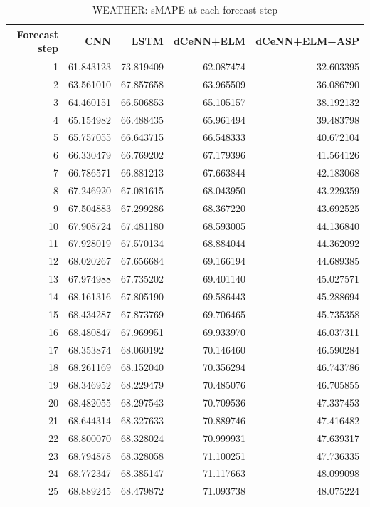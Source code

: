 \begin{table}
\caption{WEATHER: sMAPE at each forecast step}
\begin{tabular}{rrrrr}
\toprule
Forecast step & CNN & LSTM & dCeNN+ELM & dCeNN+ELM+ASP \\
\midrule
1 & 61.843123 & 73.819409 & 62.087474 & 32.603395 \\
2 & 63.561010 & 67.857658 & 63.965509 & 36.086790 \\
3 & 64.460151 & 66.506853 & 65.105157 & 38.192132 \\
4 & 65.154982 & 66.488435 & 65.961494 & 39.483798 \\
5 & 65.757055 & 66.643715 & 66.548333 & 40.672104 \\
6 & 66.330479 & 66.769202 & 67.179396 & 41.564126 \\
7 & 66.786571 & 66.881213 & 67.663844 & 42.183068 \\
8 & 67.246920 & 67.081615 & 68.043950 & 43.229359 \\
9 & 67.504883 & 67.299286 & 68.367220 & 43.692525 \\
10 & 67.908724 & 67.481180 & 68.593005 & 44.136840 \\
11 & 67.928019 & 67.570134 & 68.884044 & 44.362092 \\
12 & 68.020267 & 67.656684 & 69.166194 & 44.689385 \\
13 & 67.974988 & 67.735202 & 69.401140 & 45.027571 \\
14 & 68.161316 & 67.805190 & 69.586443 & 45.288694 \\
15 & 68.434287 & 67.873769 & 69.706465 & 45.735358 \\
16 & 68.480847 & 67.969951 & 69.933970 & 46.037311 \\
17 & 68.353874 & 68.060192 & 70.146460 & 46.590284 \\
18 & 68.261169 & 68.152040 & 70.356294 & 46.743786 \\
19 & 68.346952 & 68.229479 & 70.485076 & 46.705855 \\
20 & 68.482055 & 68.297543 & 70.709536 & 47.337453 \\
21 & 68.644314 & 68.327633 & 70.889746 & 47.416482 \\
22 & 68.800070 & 68.328024 & 70.999931 & 47.639317 \\
23 & 68.794878 & 68.328058 & 71.100251 & 47.736335 \\
24 & 68.772347 & 68.385147 & 71.117663 & 48.099098 \\
25 & 68.889245 & 68.479872 & 71.093738 & 48.075224 \\

\end{tabular}
\end{table}
